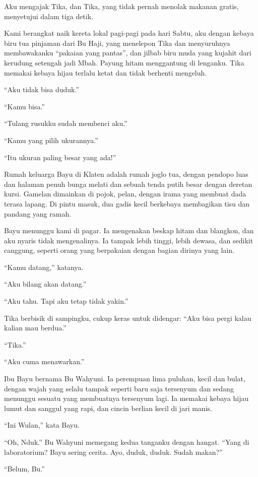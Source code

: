 \documentclass[11pt,twoside,openany]{book}
\makeatletter
\newcommand{\scenebreak}{\par\vspace{0.9em}{\centering\textsc{*\hspace{0.7em}*\hspace{0.7em}*}\par}\vspace{0.9em}\@afterindentfalse\@afterheading}
\makeatother
\begin{document}
Aku mengajak Tika, dan Tika, yang tidak pernah menolak makanan gratis, menyetujui dalam tiga detik.

Kami berangkat naik kereta lokal pagi-pagi pada hari Sabtu, aku dengan kebaya biru tua pinjaman dari Bu Haji, yang menelepon Tika dan menyuruhnya membawakanku ``pakaian yang pantas'', dan jilbab biru muda yang kujahit dari kerudung setengah jadi Mbah. Payung hitam menggantung di lenganku. Tika memakai kebaya hijau terlalu ketat dan tidak berhenti mengeluh.

``Aku tidak bisa duduk.''

``Kamu bisa.''

``Tulang rusukku sudah membenci aku.''

``Kamu yang pilih ukurannya.''

``Itu ukuran paling besar yang ada!''

Rumah keluarga Bayu di Klaten adalah rumah joglo tua, dengan pendopo luas dan halaman penuh bunga melati dan sebuah tenda putih besar dengan deretan kursi. Gamelan dimainkan di pojok, pelan, dengan irama yang membuat dada terasa lapang. Di pintu masuk, dua gadis kecil berkebaya membagikan tisu dan pandang yang ramah.

Bayu menunggu kami di pagar. Ia mengenakan beskap hitam dan blangkon, dan aku nyaris tidak mengenalinya. Ia tampak lebih tinggi, lebih dewasa, dan sedikit canggung, seperti orang yang berpakaian dengan bagian dirinya yang lain.

``Kamu datang,'' katanya.

``Aku bilang akan datang.''

``Aku tahu. Tapi aku tetap tidak yakin.''

Tika berbisik di sampingku, cukup keras untuk didengar: ``Aku bisa pergi kalau kalian mau berdua.''

``Tika.''

``Aku cuma menawarkan.''

\scenebreak
Ibu Bayu bernama Bu Wahyuni. Ia perempuan lima puluhan, kecil dan bulat, dengan wajah yang selalu tampak seperti baru saja tersenyum dan sedang menunggu sesuatu yang membuatnya tersenyum lagi. Ia memakai kebaya hijau lumut dan sanggul yang rapi, dan cincin berlian kecil di jari manis.

``Ini Wulan,'' kata Bayu.

``Oh, Nduk.'' Bu Wahyuni memegang kedua tanganku dengan hangat. ``Yang di laboratorium? Bayu sering cerita. Ayo, duduk, duduk. Sudah makan?''

``Belum, Bu.''
\end{document}
